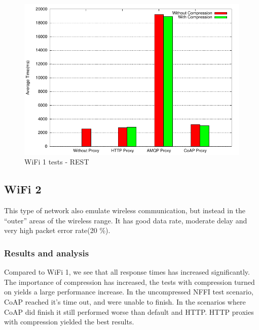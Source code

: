 \begin{figure}[H]
\center
\includegraphics[scale=0.75]{../results/wifi1/rest/result.pdf}
\caption{WiFi 1 tests - REST}
\end{figure}


\subsection{WiFi 2}

This type of network also emulate wireless communication, but instead in the
``outer'' areas of the wireless range. It has good data rate, moderate delay
and very high packet error rate(20 \%).


\subsubsection{Results and analysis}

Compared to WiFi 1, we see that all response times has increased
significantly. The importance of compression has increased, the tests with
compression turned on yields a large performance increase. In the uncompressed
NFFI test scenario, CoAP reached it's time out, and were unable to finish. In
the scenarios where CoAP did finish it still performed worse than default and
HTTP. HTTP proxies with compression yielded the best results.

